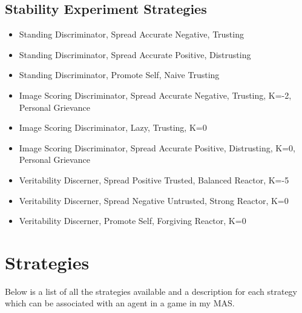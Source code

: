 \documentclass[]{final_report}
\begin{document}
\subsection{Stability Experiment Strategies}
\label{appendix:stab_strats}
\begin{itemize}
	\item Standing Discriminator, Spread Accurate Negative, Trusting
	\item Standing Discriminator, Spread Accurate Positive, Distrusting
	\item Standing Discriminator, Promote Self, Naive Trusting
	\item Image Scoring Discriminator, Spread Accurate Negative, Trusting, K=-2, Personal Grievance
	\item Image Scoring Discriminator, Lazy, Trusting, K=0
	\item Image Scoring Discriminator, Spread Accurate Positive, Distrusting, K=0, Personal Grievance
	\item Veritability Discerner, Spread Positive Trusted, Balanced Reactor, K=-5
	\item Veritability Discerner, Spread Negative Untrusted, Strong Reactor, K=0
	\item Veritability Discerner, Promote Self, Forgiving Reactor, K=0
\end{itemize}

\section{Strategies}
\label{appendix:strats}
Below is a list of all the strategies available and a description for each strategy which can be associated with an agent in a game in my MAS.
\inputminted[breaklines]{json}{strategies.json}
\end{document}
